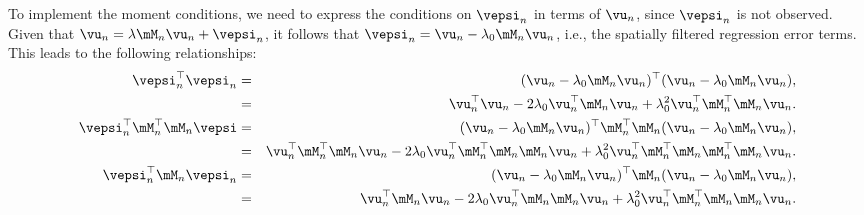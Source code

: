 \documentclass[english,12pt]{book}\usepackage[]{graphicx}\usepackage[]{xcolor}
\begin{document}
To implement the moment conditions, we need to express the conditions on $\vepsi_n$ in terms of $\vu_n$, since $\vepsi_n$ is not observed. Given that $\vu_n = \lambda \mM_n\vu_n + \vepsi_n$, it follows that $\vepsi_n = \vu_n - \lambda_0\mM_n\vu_n$, i.e., the spatially filtered regression error terms. This leads to the following relationships:
\begin{eqnarray}
\vepsi^\top_n \vepsi_n & = & (\vu_n - \lambda_0\mM_n\vu_n)^\top(\vu_n - \lambda_0\mM_n\vu_n), \nonumber \\ 
                   & = & \vu^\top_n\vu_n - 2\lambda_0\vu^\top_n\mM_n\vu_n + \lambda^2_0\vu^\top_n\mM^\top_n\mM_n\vu_n \label{eq:mom_1}.\\
\vepsi^\top_n \mM^\top_n\mM_n \vepsi& = &(\vu_n - \lambda_0\mM_n\vu_n)^\top\mM^\top_n\mM_n(\vu_n - \lambda_0\mM_n\vu_n), \nonumber \\
                   &= & \vu^\top_n\mM^\top_n\mM_n\vu_n - 2\lambda_0\vu^\top_n\mM^\top_n\mM_n\mM_n\vu_n + \lambda^2_0\vu^\top_n\mM^\top_n\mM_n\mM^\top_n\mM_n\vu_n. \label{eq:mom_2} \\
\vepsi^\top_n\mM_n\vepsi_n& = &(\vu_n - \lambda_0\mM_n\vu_n)^\top\mM_n(\vu_n - \lambda_0\mM_n\vu_n), \nonumber \\ 
                   &=& \vu^\top_n\mM_n\vu_n - 2\lambda_0\vu^\top_n\mM_n\mM_n\vu_n + \lambda^2_0\vu^\top_n\mM^\top_n\mM_n\mM_n\vu_n. \label{eq:mom_3}
\end{eqnarray}
\end{document}
